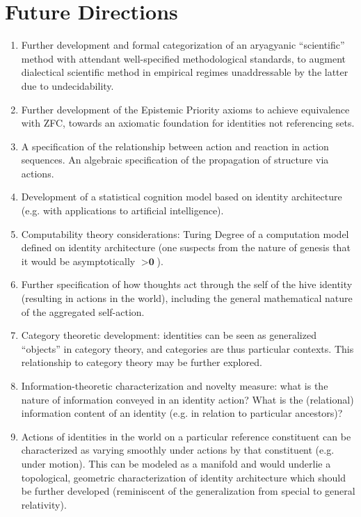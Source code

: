 \documentclass[pra,twocolumn,groupedaddress,10pt]{revtex4}
\theoremstyle{definition}
\begin{document}
\section{Future Directions} \label{sec:futdir}

\begin{enumerate}
	\item Further development and formal categorization of an aryagyanic ``scientific'' method with attendant well-specified methodological standards, to augment dialectical scientific method in empirical regimes unaddressable by the latter due to undecidability.
	\item Further development of the Epistemic Priority axioms to achieve equivalence with ZFC, towards an axiomatic foundation for identities not referencing sets.
	\item A specification of the relationship between action and reaction in action sequences. An algebraic specification of the propagation of structure via actions.
	\item Development of a statistical cognition model based on identity architecture (e.g. with applications to artificial intelligence).
	\item Computability theory considerations: Turing Degree of a computation model defined on identity architecture (one suspects from the nature of genesis that it would be asymptotically $> \textbf{0}$).
	\item Further specification of how thoughts act through the self of the hive identity (resulting in actions in the world), including the general mathematical nature of the aggregated self-action.
	\item Category theoretic development: identities can be seen as generalized ``objects'' in category theory, and categories are thus particular contexts. This relationship to category theory may be further explored.
	\item Information-theoretic characterization and novelty measure: what is the nature of information conveyed in an identity action? What is the (relational) information content of an identity (e.g. in relation to particular ancestors)?
	\item Actions of identities in the world on a particular reference constituent can be characterized as varying smoothly under actions by that constituent (e.g. under motion). This can be modeled as a manifold and would underlie a topological, geometric characterization of identity architecture which should be further developed (reminiscent of the generalization from special to general relativity).

\end{enumerate}
\end{document}
